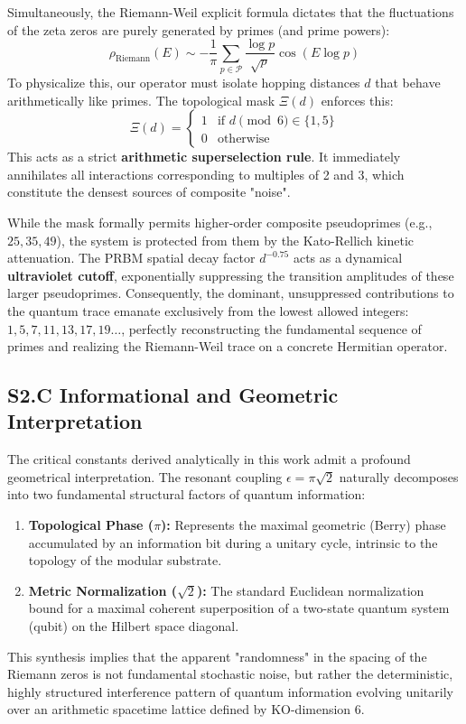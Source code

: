 \documentclass[aps,prl,preprint,superscriptaddress,floatfix]{revtex4-2}
\begin{document}
Simultaneously, the Riemann-Weil explicit formula dictates that the fluctuations of the zeta zeros are purely generated by primes (and prime powers):
\begin{equation}
\rho_{\text{Riemann}}(E) \sim -\frac{1}{\pi} \sum_{p \in \mathcal{P}} \frac{\log p}{\sqrt{p}} \cos(E \log p)
\end{equation}
To physicalize this, our operator must isolate hopping distances $d$ that behave arithmetically like primes. The topological mask $\Xi(d)$ enforces this:
\begin{equation}
\Xi(d) = \begin{cases} 1 & \text{if } d \pmod 6 \in \{1, 5\} \\ 0 & \text{otherwise} \end{cases}
\end{equation}
This acts as a strict \textbf{arithmetic superselection rule}. It immediately annihilates all interactions corresponding to multiples of 2 and 3, which constitute the densest sources of composite "noise". 

While the mask formally permits higher-order composite pseudoprimes (e.g., $25, 35, 49$), the system is protected from them by the Kato-Rellich kinetic attenuation. The PRBM spatial decay factor $d^{-0.75}$ acts as a dynamical \textbf{ultraviolet cutoff}, exponentially suppressing the transition amplitudes of these larger pseudoprimes. Consequently, the dominant, unsuppressed contributions to the quantum trace emanate exclusively from the lowest allowed integers: $1, 5, 7, 11, 13, 17, 19\dots$, perfectly reconstructing the fundamental sequence of primes and realizing the Riemann-Weil trace on a concrete Hermitian operator.

\subsection{S2.C Informational and Geometric Interpretation}

The critical constants derived analytically in this work admit a profound geometrical interpretation. The resonant coupling $\epsilon = \pi\sqrt{2}$ naturally decomposes into two fundamental structural factors of quantum information:
\begin{enumerate}
    \item \textbf{Topological Phase ($\pi$):} Represents the maximal geometric (Berry) phase accumulated by an information bit during a unitary cycle, intrinsic to the topology of the modular substrate.
    \item \textbf{Metric Normalization ($\sqrt{2}$):} The standard Euclidean normalization bound for a maximal coherent superposition of a two-state quantum system (qubit) on the Hilbert space diagonal.
\end{enumerate}
This synthesis implies that the apparent "randomness" in the spacing of the Riemann zeros is not fundamental stochastic noise, but rather the deterministic, highly structured interference pattern of quantum information evolving unitarily over an arithmetic spacetime lattice defined by KO-dimension 6.
\end{document}
